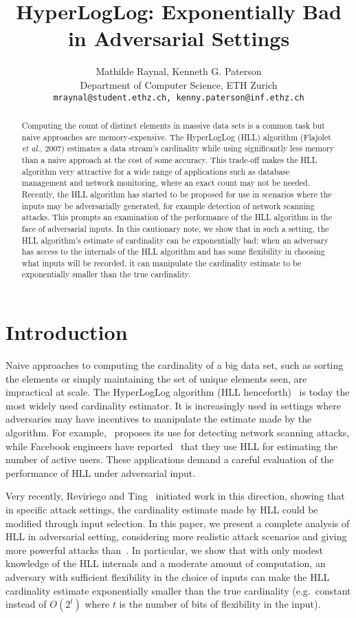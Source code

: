 \documentclass[11pt]{article}
\title{HyperLogLog: Exponentially Bad in Adversarial Settings}
\author{Mathilde Raynal, Kenneth G. Paterson\\
\vspace{3mm}
Department of Computer Science, ETH Zurich\\
{\tt mraynal@student.ethz.ch, kenny.paterson@inf.ethz.ch}}
\begin{document}
\maketitle

\begin{abstract}
Computing the count of distinct elements in massive data sets is a common task but naive approaches are memory-expensive. The HyperLogLog (HLL) algorithm (Flajolet \emph{et al.}, 2007) estimates a data stream's cardinality while using significantly less memory than a naive approach at the cost of some accuracy. This trade-off makes the HLL algorithm very attractive for a wide range of applications such as database management and network monitoring, where an exact count may not be needed. Recently, the HLL algorithm has started to be proposed for use in scenarios where the inputs may be adversarially generated, for example detection of network scanning attacks. This prompts an examination of the performance of the HLL algorithm in the face of adversarial inputs. In this cautionary note, we show that in such a setting, the HLL algorithm's estimate of cardinality can be exponentially bad: when an adversary has access to the internals of the HLL algorithm and has some flexibility in choosing what inputs will be recorded, it can manipulate the cardinality estimate to be exponentially smaller than the true cardinality.
\end{abstract}


\section{Introduction}
Naive approaches to computing the cardinality of a big data set, such as sorting the elements or simply maintaining the set of unique elements seen, are impractical at scale. The HyperLogLog algorithm (HLL henceforth)~\cite{hll} is today the most widely used cardinality estimator. It is increasingly used in settings where adversaries may have  incentives to manipulate the estimate made by the algorithm. For example,~\cite{portscanhll} proposes its use for detecting network scanning attacks, while Facebook engineers have reported~\cite{fbhll} that they use HLL for estimating the number of active users. These applications demand a careful evaluation of the performance of HLL under adversarial input.

Very recently, Reviriego and Ting~\cite{hllvuln} initiated work in this direction, showing that in specific attack settings, the cardinality estimate made by HLL could be modified through input selection. In this paper, we present a complete analysis of HLL in adversarial setting, considering more realistic attack scenarios and giving more powerful attacks than~\cite{hllvuln}. In particular, we show that with only modest knowledge of the HLL internals and a moderate amount of computation, an adversary with sufficient flexibility in the choice of inputs can make the HLL cardinality estimate exponentially smaller than the true cardinality (e.g.\ constant instead of $O(2^t)$ where $t$ is the number of bits of flexibility in the input).
\end{document}
